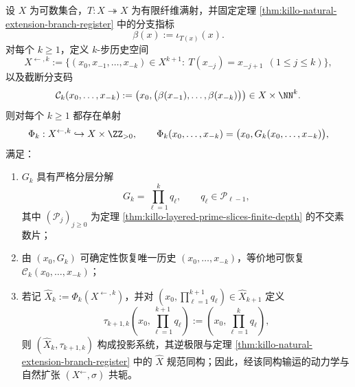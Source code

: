 \begin{theorem}\label{thm:xi-prime-register-history-inverse-limit}
设 \(X\) 为可数集合，\(T:X\twoheadrightarrow X\) 为有限纤维满射，并固定定理 \ref{thm:killo-natural-extension-branch-register} 中的分支指标
\[
\beta(x):=\iota_{T(x)}(x).
\]
对每个 \(k\ge 1\)，定义 \(k\)-步历史空间
\[
X^{\leftarrow,k}
:=
\{(x_0,x_{-1},\dots,x_{-k})\in X^{k+1}:\ T(x_{-j})=x_{-j+1}\ \ (1\le j\le k)\},
\]
以及截断分支码
\[
\mathcal C_k(x_0,\dots,x_{-k})
:=
\bigl(x_0,\bigl(\beta(x_{-1}),\dots,\beta(x_{-k})\bigr)\bigr)\in X\times \NN^k.
\]
则对每个 \(k\ge 1\) 都存在单射
\[
\Phi_k:X^{\leftarrow,k}\hookrightarrow X\times \ZZ_{>0},
\qquad
\Phi_k(x_0,\dots,x_{-k})=\bigl(x_0,G_k(x_0,\dots,x_{-k})\bigr),
\]
满足：
\begin{enumerate}
  \item \(G_k\) 具有严格分层分解
  \[
  G_k=\prod_{\ell=1}^{k}q_\ell,
  \qquad
  q_\ell\in\mathcal P_{\ell-1},
  \]
  其中 \((\mathcal P_j)_{j\ge 0}\) 为定理 \ref{thm:killo-layered-prime-slices-finite-depth} 的不交素数片；
  \item 由 \((x_0,G_k)\) 可确定性恢复唯一历史 \((x_0,\dots,x_{-k})\)，等价地可恢复 \(\mathcal C_k(x_0,\dots,x_{-k})\)；
  \item 若记 \(\widehat X_k:=\Phi_k(X^{\leftarrow,k})\)，并对 \((x_0,\prod_{\ell=1}^{k+1}q_\ell)\in\widehat X_{k+1}\) 定义
  \[
  \tau_{k+1,k}\!\left(x_0,\prod_{\ell=1}^{k+1}q_\ell\right)
  :=
  \left(x_0,\prod_{\ell=1}^{k}q_\ell\right),
  \]
  则 \((\widehat X_k,\tau_{k+1,k})\) 构成投影系统，其逆极限与定理 \ref{thm:killo-natural-extension-branch-register} 中的 \(\widehat X\) 规范同构；因此，经该同构输运的动力学与自然扩张 \((X^{\leftarrow},\sigma)\) 共轭。
\end{enumerate}
\end{theorem}

